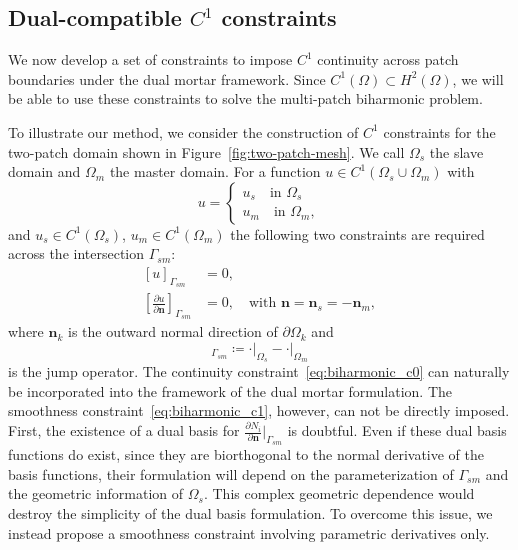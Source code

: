 \subsection{Dual-compatible $C^1$ constraints}

We now develop a set of constraints to impose $C^1$ continuity across patch boundaries under the dual mortar framework. Since $C^1(\Omega) \subset H^2(\Omega)$, we will be able to use these constraints to solve the multi-patch biharmonic problem.\par

To illustrate our method, we consider the construction of $C^1$ constraints for the two-patch domain shown in Figure~\ref{fig:two-patch-mesh}. We call $\Omega_s$ the slave domain and $\Omega_m$ the master domain. For a function $u \in C^1( \Omega_s \cup \Omega_m )$ with
\begin{equation}
  u=
  \begin{cases}
    u_s\quad \text{in }\Omega_s \\
    u_m\quad \text{in }\Omega_m,
  \end{cases}
\end{equation}
and $u_s\in{}C^1(\Omega_s)$, $u_m\in{}C^1(\Omega_m)$ the following two constraints are required across the intersection $\Gamma_{sm}$:
\begin{subequations}
  \begin{align}
    [u]_{\Gamma_{sm}}                                                   & =0,\label{eq:biharmonic_c0}                                                        \\
    \left[\frac{\partial{u}}{\partial{\mathbf{n}}}\right]_{\Gamma_{sm}} & =0,\quad\text{with }\mathbf{n}=\mathbf{n}_s=-\mathbf{n}_m,\label{eq:biharmonic_c1}
  \end{align}
\end{subequations}
where $\mathbf{n}_k$ is the outward normal direction of $\partial{\Omega_k}$ and
\begin{equation}
  [\cdot]_{\Gamma_{sm}}\coloneq\cdot\vert_{\Omega_s}-\cdot\vert_{\Omega_m}
\end{equation}
is the jump operator. The continuity constraint~\eqref{eq:biharmonic_c0} can naturally be incorporated into the framework of the dual mortar formulation. The smoothness constraint~\eqref{eq:biharmonic_c1}, however, can not be directly imposed. First, the existence of a dual basis for $\frac{\partial{N_i}}{\partial{\mathbf{n}}}\vert_{\Gamma_{sm}}$ is doubtful. Even if these dual basis functions do exist, since they are biorthogonal to the normal derivative of the basis functions, their formulation will depend on the parameterization of $\Gamma_{sm}$ and the geometric information of $\Omega_s$. This complex geometric dependence would destroy the simplicity of the dual basis formulation. To overcome this issue, we instead propose a smoothness constraint involving parametric derivatives only.
